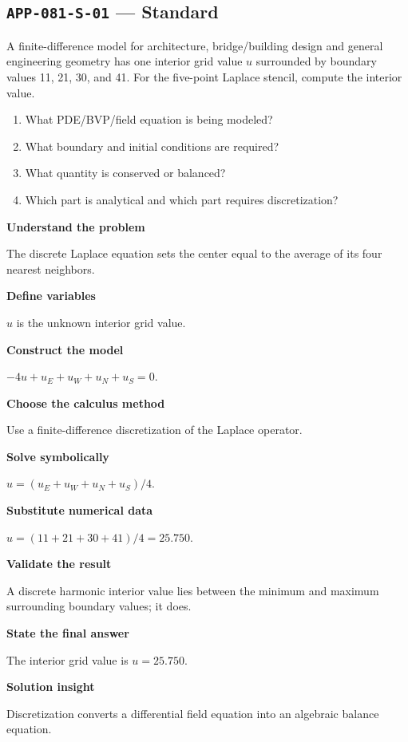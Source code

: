 \documentclass[11pt]{book}
\newcommand{\pid}[1]{\texttt{#1}}
\begin{document}
\subsection*{\pid{APP-081-S-01} — Standard}
\begin{problembox}
A finite-difference model for architecture, bridge/building design and general engineering geometry has one interior grid value $u$ surrounded by boundary values 11, 21, 30, and 41. For the five-point Laplace stencil, compute the interior value.
\end{problembox}
\begin{promptbox}\begin{enumerate}
\item What PDE/BVP/field equation is being modeled?
\item What boundary and initial conditions are required?
\item What quantity is conserved or balanced?
\item Which part is analytical and which part requires discretization?
\end{enumerate}\end{promptbox}
\begin{solutionbox}
\textbf{Understand the problem}\par The discrete Laplace equation sets the center equal to the average of its four nearest neighbors.\par\medskip
\textbf{Define variables}\par $u$ is the unknown interior grid value.\par\medskip
\textbf{Construct the model}\par $-4u+u_E+u_W+u_N+u_S=0$.\par\medskip
\textbf{Choose the calculus method}\par Use a finite-difference discretization of the Laplace operator.\par\medskip
\textbf{Solve symbolically}\par $u=(u_E+u_W+u_N+u_S)/4$.\par\medskip
\textbf{Substitute numerical data}\par $u=(11+21+30+41)/4=25.750$.\par\medskip
\textbf{Validate the result}\par A discrete harmonic interior value lies between the minimum and maximum surrounding boundary values; it does.\par\medskip
\textbf{State the final answer}\par The interior grid value is $u=25.750$.\par\medskip
\textbf{Solution insight}\par Discretization converts a differential field equation into an algebraic balance equation.\par\medskip
\end{solutionbox}
\end{document}
